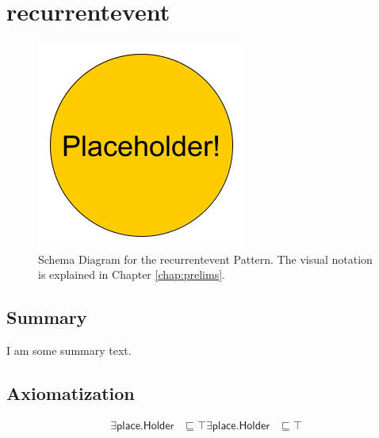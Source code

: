 \section{recurrentevent}
\label{sec:recurrentevent}
\begin{figure}[h!]
\begin{center}
\includegraphics[width=.8\textwidth]{figures/placeholder}
\end{center}
\caption{Schema Diagram for the recurrentevent Pattern. The visual notation is explained in Chapter \ref{chap:prelims}.}
\label{fig:recurrentevent}
\end{figure}
\subsection{Summary}
\label{sum:recurrentevent}
I am some summary text.

\subsection{Axiomatization}
\label{axs:recurrentevent}
\begin{align}
\exists\textsf{place.Holder} &\sqsubseteq \top 
\exists\textsf{place.Holder} &\sqsubseteq \top 
\end{align}

